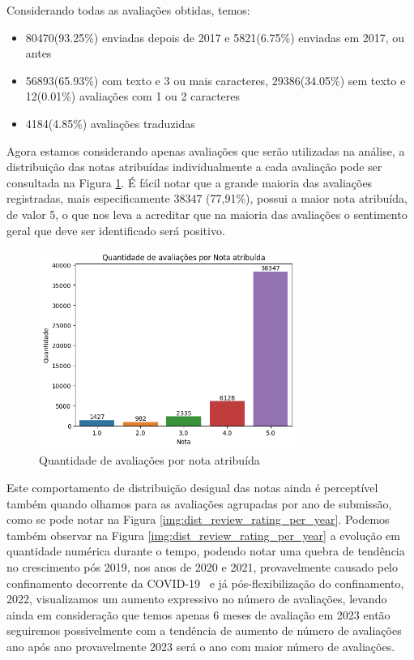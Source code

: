 Considerando todas as avaliações obtidas, temos:

\begin{itemize}
	\item 80470(93.25\%) enviadas depois de 2017 e 5821(6.75\%) enviadas em 2017, ou antes
	\item 56893(65.93\%) com texto e 3 ou mais caracteres, 29386(34.05\%) sem texto e 12(0.01\%) avaliações com 1 ou 2 caracteres
	\item 4184(4.85\%) avaliações traduzidas
\end{itemize}

Agora estamos considerando apenas avaliações que serão utilizadas na análise, a distribuição das notas atribuídas individualmente a cada avaliação pode ser consultada na Figura \ref{img:dist_review_rating}. É fácil notar que a grande maioria das avaliações registradas, mais especificamente 38347 (77,91\%), possui a maior nota atribuída, de valor 5, o que nos leva a acreditar que na maioria das avaliações o sentimento geral que deve ser identificado será positivo.

\begin{figure}
	\centering
	\includegraphics[width=0.75\textwidth]{figs/exploratoria/quantidade_avaliacao_nota_atribuida.png}
	\caption{Quantidade de avaliações por nota atribuída}
	\label{img:dist_review_rating}
\end{figure}

Este comportamento de distribuição desigual das notas ainda é perceptível também quando olhamos para as avaliações agrupadas por ano de submissão, como se pode notar na Figura \ref{img:dist_review_rating_per_year}. Podemos também observar na Figura \ref{img:dist_review_rating_per_year} a evolução em quantidade numérica durante o tempo, podendo notar uma quebra de tendência no crescimento pós 2019, nos anos de 2020 e 2021, provavelmente causado pelo confinamento decorrente da COVID-19~\cite{Guardia2022} e já pós-flexibilização do confinamento, 2022, visualizamos um aumento expressivo no número de avaliações, levando ainda em consideração que temos apenas 6 meses de avaliação em 2023 então seguiremos possivelmente com a tendência de aumento de número de avaliações ano após ano provavelmente 2023 será o ano com maior número de avaliações.

